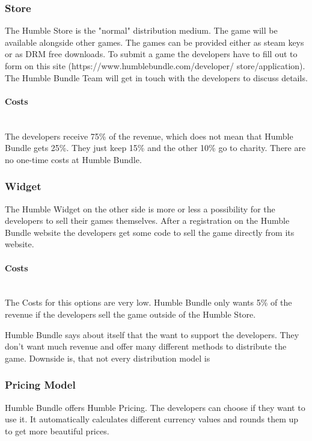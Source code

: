 \subsubsection{Store}
\label{humble_store}
The Humble Store is the "normal" distribution medium. The game will be available alongside other games. The games can be provided either as steam keys or as DRM free downloads. To submit a game the developers have to fill out to form on this site (https://www.humblebundle.com/developer/ store/application). The Humble Bundle Team will get in touch with the developers to discuss details.

\paragraph{Costs}\mbox{}\\
The developers receive 75\% of the revenue, which does not mean that Humble Bundle gets 25\%. They just keep 15\% and the other 10\% go to charity. There are no one-time costs at Humble Bundle. \citep{humble_bundle_humble_2016}

\subsubsection{Widget}
\label{humble_widget}
The Humble Widget on the other side is more or less a possibility for the developers to sell their games themselves. After a registration on the Humble Bundle website the developers get some code to sell the game directly from its website. \citep{humble_bundle_humble_2016-1}

\paragraph{Costs}\mbox{}\\
The Costs for this options are very low. Humble Bundle only wants 5\% of the revenue if the developers sell the game outside of the Humble Store.

Humble Bundle says about itself that the want to support the developers. They don't want much revenue and offer many different methods to distribute the game. Downside is, that not every distribution model is 

\subsubsection{Pricing Model}
\label{humble_pricing_model}
Humble Bundle offers Humble Pricing. The developers can choose if they want to use it. It automatically calculates different currency values and rounds them up to get more beautiful prices.

